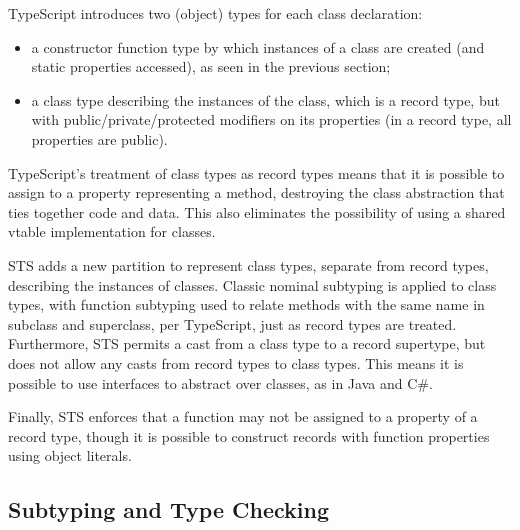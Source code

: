 TypeScript introduces two (object) types for each class declaration:
\begin{itemize}
\item a constructor function type by which instances of a class
are created (and static properties accessed), as seen in the previous section; 
\item a class type describing the instances of the class, which is a record type, but
with public/private/protected modifiers on its properties (in a record type, all properties are public).
\end{itemize}
TypeScript's treatment of class types as record types
means that it is possible to assign to a property representing a method, 
destroying the class abstraction that ties together code and data. This also 
eliminates the possibility of using a shared vtable implementation for classes.

STS adds a new partition to represent class types, separate from record types, 
describing the instances of classes. 
Classic nominal subtyping is applied to class types, with function subtyping used to relate methods with 
the same name in subclass and superclass, per TypeScript, just as record types are treated.
Furthermore, STS permits a cast from a class type
to a record supertype, but does not allow any casts from record types to class types. This means
it is possible to use interfaces to abstract over classes, as in Java and C\#. 

Finally, STS enforces that a function may not be assigned to a property of a record type, 
though it is possible to construct records with function properties using object literals. 

\subsection{Subtyping and Type Checking}

